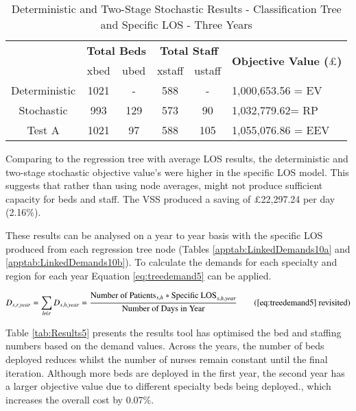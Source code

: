 \documentclass[../thesis.tex]{subfiles}
\begin{document}
\begin{table}[h!]
    \centering
    \begin{tabular}{cccccl}\toprule
 & \multicolumn{2}{l}{\textbf{Total Beds}} & \multicolumn{2}{c}{\textbf{Total Staff}} & \multirow{2}{*}{\textbf{Objective Value ($\pounds$)}}\\ \cmidrule(lr){2-3} \cmidrule(lr){4-5}
 & xbed           & ubed          & xstaff         & ustaff         \\ \midrule
    Deterministic      & 1021 & - & 588 & - & 1,000,653.56 = EV \\ \midrule
    Stochastic &993& 129& 573 & 90& 1,032,779.62= RP \\ \midrule
    Test A & 1021 & 97 & 588 & 105 & 1,055,076.86 = EEV \\\bottomrule
    \end{tabular}
    \caption{Deterministic and Two-Stage Stochastic Results - Classification Tree and Specific LOS - Three Years}
    \label{tab:Results9}
\end{table}

Comparing to the regression tree with average LOS results, the deterministic and two-stage stochastic objective value's were higher in the specific LOS model. This suggests that rather than using node averages, might not produce sufficient capacity for beds and staff. The VSS produced a saving of $\pounds$22,297.24 per day (2.16\%). 

These results can be analysed on a year to year basis with the specific LOS produced from each regression tree node (Tables \ref{apptab:LinkedDemands10a} and \ref{apptab:LinkedDemands10b}). To calculate the demands for each specialty and region for each year Equation \eqref{eq:treedemand5} can be applied.


\begin{equation}
        D_{s,r,year} = \sum\limits_{h \in r} D_{s,h,year} = \frac{\text{Number of Patients}_{s,h}*{\text{Specific LOS}_{s,h,year}}}{{\text{Number of Days in Year}}} \tag{\ref{eq:treedemand5} revisited}
\end{equation}

Table \ref{tab:Results5} presents the results tool has optimised the bed and staffing numbers based on the demand values. Across the years, the number of beds deployed reduces whilst the number of nurses remain constant until the final iteration. Although more beds are deployed in the first year, the second year has a larger objective value due to different specialty beds being deployed., which increases the overall cost by 0.07\%.
\end{document}

